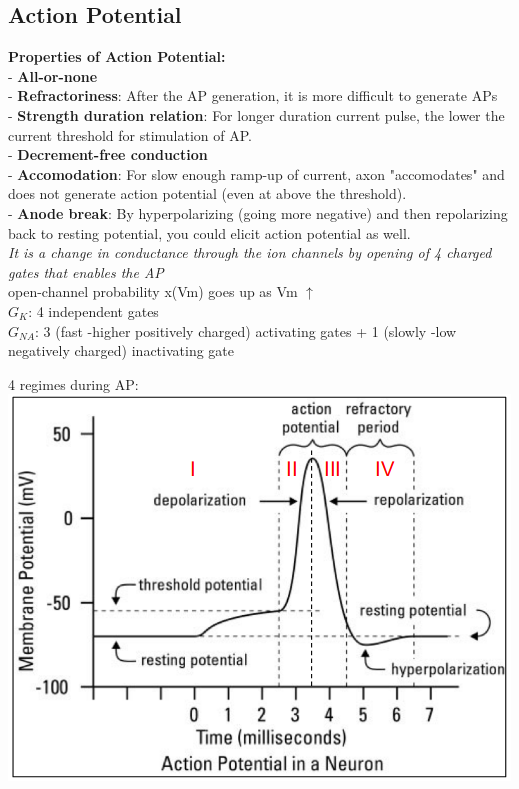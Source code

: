 \documentclass[9pt]{article}
\begin{document}
\begin{multicols}{2}
		
		
		\subsection{Action Potential}
		\textbf{Properties of Action Potential: }\\
- \textbf{All-or-none}\\
- \textbf{Refractoriness}: After the AP generation, it is more difficult to generate APs\\
- \textbf{Strength duration relation}: For longer duration current
pulse, the lower the current
threshold for stimulation of
AP.\\
- \textbf{Decrement-free conduction}\\
- \textbf{Accomodation}: For slow enough ramp-up of current, axon "accomodates" and does
not generate action potential (even at above the threshold).\\
-\textbf{ Anode break}: By hyperpolarizing (going more negative) and then repolarizing back to
resting potential, you could elicit action potential as well.\\
\textit{It is a change in conductance through the ion channels by opening of 4 charged gates that enables the AP}\\
open-channel probability x(Vm) goes up as Vm $\uparrow$\\
$G_K$: 4 independent gates\\
$G_{NA}$: 3 (fast -higher positively charged) activating gates + 1 (slowly -low negatively charged) inactivating gate

		4 regimes during AP:\\

		\includegraphics[width=0.8\linewidth]{Images/AP.png}


\end{multicols}
\end{document}
